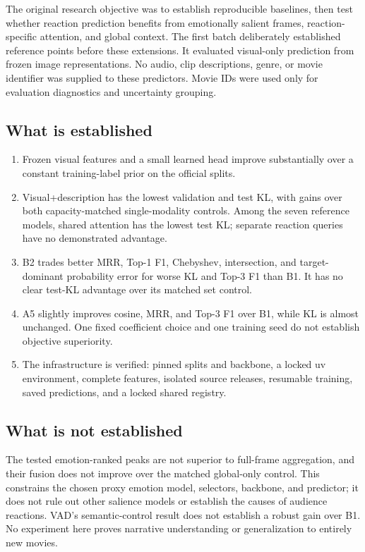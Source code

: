 \documentclass[11pt,a4paper]{article}
\begin{document}
The original research objective was to establish reproducible baselines, then test whether reaction prediction benefits from emotionally salient frames, reaction-specific attention, and global context. The first batch deliberately established reference points before these extensions. It evaluated visual-only prediction from frozen image representations. No audio, clip descriptions, genre, or movie identifier was supplied to these predictors. Movie IDs were used only for evaluation diagnostics and uncertainty grouping.

\subsection{What is established}
\begin{enumerate}
\item Frozen visual features and a small learned head improve substantially over a constant training-label prior on the official splits.
\item Visual+description has the lowest validation and test KL, with gains over both capacity-matched single-modality controls. Among the seven reference models, shared attention has the lowest test KL; separate reaction queries have no demonstrated advantage.
\item B2 trades better MRR, Top-1 F1, Chebyshev, intersection, and target-dominant probability error for worse KL and Top-3 F1 than B1. It has no clear test-KL advantage over its matched set control.
\item A5 slightly improves cosine, MRR, and Top-3 F1 over B1, while KL is almost unchanged. One fixed coefficient choice and one training seed do not establish objective superiority.
\item The infrastructure is verified: pinned splits and backbone, a locked uv environment, complete features, isolated source releases, resumable training, saved predictions, and a locked shared registry.
\end{enumerate}

\subsection{What is not established}
The tested emotion-ranked peaks are not superior to full-frame aggregation, and their fusion does not improve over the matched global-only control. This constrains the chosen proxy emotion model, selectors, backbone, and predictor; it does not rule out other salience models or establish the causes of audience reactions. VAD's semantic-control result does not establish a robust gain over B1. No experiment here proves narrative understanding or generalization to entirely new movies.
\end{document}
